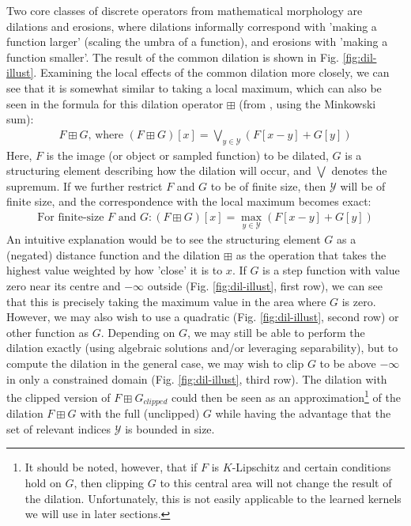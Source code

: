 \documentclass[a4paper, 12pt]{report}
\begin{document}
Two core classes of discrete operators from mathematical morphology are dilations and erosions, where dilations informally correspond with 'making a function larger' (scaling the umbra of a function), and erosions with 'making a function smaller'. The result of the common dilation is shown in Fig. \ref{fig:dil-illust}. Examining the local effects of the common dilation more closely, we can see that it is somewhat similar to taking a local maximum, which can also be seen in the formula for this dilation operator $\boxplus$  (from \cite{heijmans1996morphological}, using the Minkowski sum): 
\begin{align}
F \boxplus G \textrm{, where }(F \boxplus G)[x] = \bigvee_ {y\in\mathcal{Y}} \left(F[x-y] + G[y]\right)	
\end{align}
\noindent
Here, $F$ is the image (or object or sampled function) to be dilated, $G$ is a structuring element describing how the dilation will occur, and $\bigvee$ denotes the supremum. If we further restrict $F$ and $G$ to be of finite size, then $\mathcal{Y}$ will be of finite size, and the correspondence with the local maximum becomes exact:
\begin{align}
\textrm{For finite-size }F\textrm{ and }G: (F \boxplus G)[x] = \max_ {y\in\mathcal{Y}} \left(F[x-y] + G[y]\right)	
\end{align}
 An intuitive explanation would be to see the structuring element $G$ as a (negated) distance function and the dilation $\boxplus$ as the operation that takes the highest value weighted by how 'close' it is to $x$. If $G$ is a step function with value zero near its centre and $-\infty$ outside (Fig. \ref{fig:dil-illust}, first row), we can see that this is precisely taking the maximum value in the area where $G$ is zero. However, we may also wish to use a quadratic (Fig. \ref{fig:dil-illust}, second row) or other function as $G$. Depending on $G$, we may still be able to perform the dilation exactly (using algebraic solutions and/or leveraging separability), but to compute the dilation in the general case, we may wish to clip $G$ to be above $-\infty$ in only a constrained domain (Fig. \ref{fig:dil-illust}, third row). The dilation with the clipped version of $F\boxplus G_{clipped}$ could then be seen as an approximation\footnote{It should be noted, however, that if $F$ is $K$-Lipschitz and certain conditions hold on $G$, then clipping $G$ to this central area will not change the result of the dilation. Unfortunately, this is not easily applicable to the learned kernels we will use in later sections.
} of the dilation $F\boxplus G$ with the full (unclipped) $G$ while having the advantage that the set of relevant indices $\mathcal{Y}$ is bounded in size. 
\end{document}
